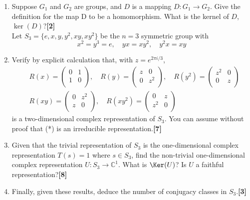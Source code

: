 \documentclass[a4paper]{article}
\begin{document}
\begin{qns}
\begin{enumerate}[label=(\roman*)]
\item Suppose $G_1$ and $G_2$ are groups, and $D$ is a mapping $D : G_1\rightarrow G_2$. Give the definition for the map D to be a homomorphism. What is the kernel of $D$, $\ker(D)$?\hfill\textbf{[2]}\\[5pt]
Let $S_3 = \{e, x, y, y^2, xy, xy^2\}$ be the $n = 3$ symmetric group with
$$x^2=y^3=e,\quad yx=xy^2,\quad y^2x=xy$$
\item Verify by explicit calculation that, with $z=e^{2\pi i/3}$,
\begin{align}
    &R(x)=\begin{pmatrix}0&1\\1&0\\\end{pmatrix},\quad R(y)=\begin{pmatrix}z&0\\0&z^2\\\end{pmatrix},\quad R(y^2)=\begin{pmatrix}z^2&0\\0&z\\\end{pmatrix}\nonumber\\&R(xy)=\begin{pmatrix}0&z^2\\z&0\\\end{pmatrix},\quad R(xy^2)=\begin{pmatrix}0&z\\z^2&0\\\end{pmatrix}\tag{*}
\end{align}
is a two-dimensional complex representation of $S_3$. You can assume without proof that (*) is an irreducible representation.\hfill\textbf{[7]}
\item Given that the trivial representation of $S_3$ is the one-dimensional complex representation $T(s) = 1$ where $s\in S_3$, find the non-trivial one-dimensional complex representation $U:S_3\rightarrow\mathbb{C}^1$. What is $\Ker(U)$? Is $U$ a faithful representation?\hfill\textbf{[8]}
\item Finally, given these results, deduce the number of conjugacy classes in $S_3$.\hfill\textbf{[3]}
\end{enumerate}
\end{qns}
\end{document}
